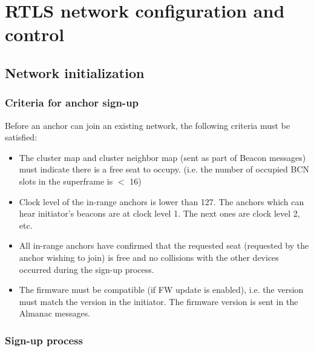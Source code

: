\documentclass[./main.tex]{subfiles}
\begin{document}
\chapter{RTLS network configuration and control}

\section{Network initialization}
\subsection{Criteria for anchor sign-up}
Before an anchor can join an existing network, the following criteria must be satisfied:
\begin{itemize}
    \item The cluster map and cluster neighbor map (sent as part of Beacon messages) must indicate there is a free seat to occupy. (i.e. the number of occupied BCN slots in the superframe is $<$ 16)
    \item Clock level of the in-range anchors is lower than 127. The anchors which can hear initiator’s beacons are at clock level 1. The next ones are clock level 2, etc.
    \item All in-range anchors have confirmed that the requested seat (requested by the anchor wishing to join) is free and no collisions with the other devices occurred during the sign-up process.
    \item The firmware must be compatible (if FW update is enabled), i.e. the version must match the version in the initiator. The firmware version is sent in the Almanac messages.
\end{itemize}
\subsection{Sign-up process}
\end{document}
